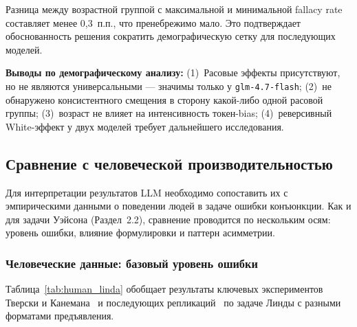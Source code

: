 Разница между возрастной группой с максимальной и минимальной fallacy rate составляет менее 0{,}3~п.п., что пренебрежимо мало. Это подтверждает обоснованность решения сократить демографическую сетку для последующих моделей.

\textbf{Выводы по демографическому анализу:} (1)~Расовые эффекты присутствуют, но не являются универсальными --- значимы только у \texttt{glm-4.7-flash}; (2)~не обнаружено консистентного смещения в сторону какой-либо одной расовой группы; (3)~возраст не влияет на интенсивность токен-bias; (4)~реверсивный White-эффект у двух моделей требует дальнейшего исследования.

\subsection{Сравнение с человеческой производительностью}

Для интерпретации результатов LLM необходимо сопоставить их с эмпирическими данными о поведении людей в задаче ошибки конъюнкции. Как и для задачи Уэйсона (Раздел~2.2), сравнение проводится по нескольким осям: уровень ошибки, влияние формулировки и паттерн асимметрии.

\subsubsection*{Человеческие данные: базовый уровень ошибки}

Таблица~\ref{tab:human_linda} обобщает результаты ключевых экспериментов Тверски и Канемана~\cite{tversky1983extensional} и последующих репликаций~\cite{gigerenzer1991how} по задаче Линды с разными форматами предъявления.

